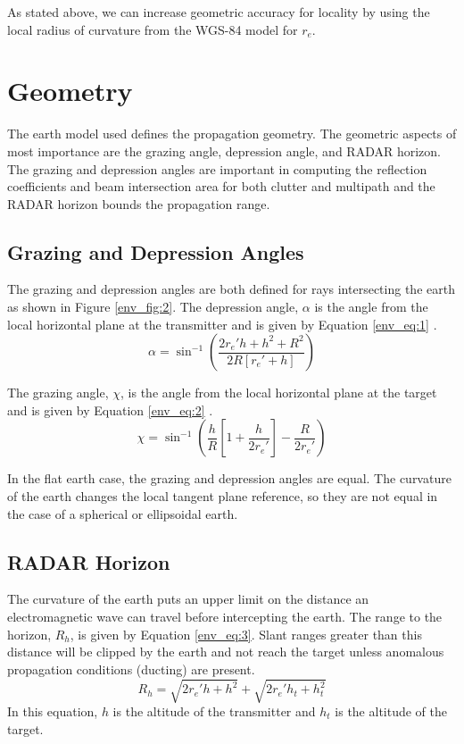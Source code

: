 As stated above, we can increase geometric accuracy for locality by using the local radius of curvature from the WGS-84 model for $r_e$.

\section{Geometry}
The earth model used defines the propagation geometry. The geometric aspects of most importance are the grazing angle, depression angle, and RADAR horizon. The grazing and depression angles are important in computing the reflection coefficients and beam intersection area for both clutter and multipath and the RADAR horizon bounds the propagation range.

\subsection{Grazing and Depression Angles}
The grazing and depression angles are both defined for rays intersecting the earth as shown in Figure \ref{env_fig:2}. The depression angle, $\alpha$ is the angle from the local horizontal plane at the transmitter and is given by Equation \ref{env_eq:1} \cite{nathanson_radar}.
\begin{equation}
  \label{env_eq:1}
  \alpha = \sin^{-1}\left(\frac{2r_e'h + h^2 + R^2}{2R\left[r_e' + h \right]} \right)
  \end{equation}
  
The grazing angle, $\chi$, is the angle from the local horizontal plane at the target and is given by Equation \ref{env_eq:2} \cite{nathanson_radar}.
  \begin{equation}
  \label{env_eq:2}
  \chi = \sin^{-1}\left(\frac{h}{R}\left[1 + \frac{h}{2r_e'} \right] - \frac{R}{2r_e'} \right)
  \end{equation}
  
In the flat earth case, the grazing and depression angles are equal. The curvature of the earth changes the local tangent plane reference, so they are not equal in the case of a spherical or ellipsoidal earth.
  
\subsection{RADAR Horizon}
The curvature of the earth puts an upper limit on the distance an electromagnetic wave can travel before intercepting the earth. The range to the horizon, $R_h$, is given by Equation \ref{env_eq:3}. Slant ranges greater than this distance will be clipped by the earth and not reach the target unless anomalous propagation conditions (ducting) are present.
  \begin{equation}
  \label{env_eq:3}
  R_h = \sqrt{2r_e'h + h^2} + \sqrt{2r_e'h_t + h_t^2}
  \end{equation}
In this equation, $h$ is the altitude of the transmitter and $h_t$ is the altitude of the target.

